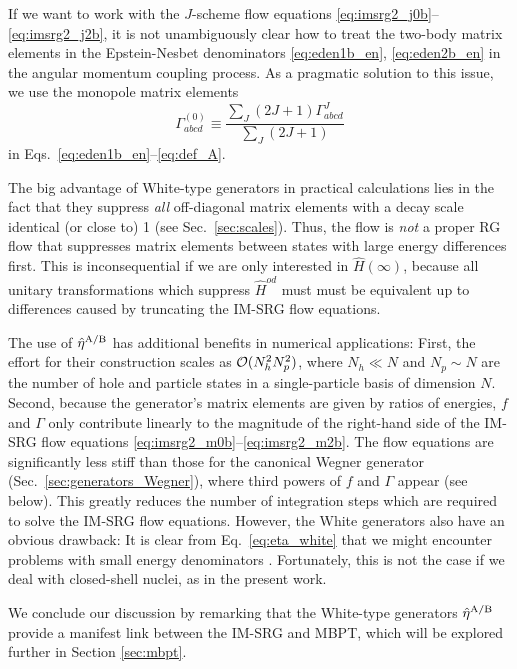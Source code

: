 If we want to work with the $J$-scheme flow equations \eqref{eq:imsrg2_j0b}--\eqref{eq:imsrg2_j2b}, it is not unambiguously clear how to treat the two-body matrix elements in the Epstein-Nesbet denominators \eqref{eq:eden1b_en}, \eqref{eq:eden2b_en} in the angular momentum coupling process. As a pragmatic solution to this issue, we use the monopole matrix elements
\begin{equation}
  \Gamma^{(0)}_{abcd}\equiv\frac{\sum_J(2J+1)\Gamma^J_{abcd}}{\sum_{J}(2J+1)}
\end{equation}
in Eqs.~\eqref{eq:eden1b_en}--\eqref{eq:def_A}. 

The big advantage of White-type generators in practical calculations lies in the fact that they suppress \emph{all} off-diagonal matrix elements with a decay scale identical (or close to) 1 (see Sec.~\ref{sec:scales}). Thus, the flow is \emph{not} a proper RG flow that suppresses matrix elements between states with large energy differences first. This is inconsequential if we are only interested in $\hat{H}(\infty)$, because all unitary transformations which suppress $\hat{H}^{od}$ must must be equivalent up to differences caused by truncating the IM-SRG flow equations.

The use of $\hat{\eta}^\text{A/B}$ has additional benefits in numerical applications: First, the effort for their construction scales as $\mathcal{O}(N_h^2N_p^2)$, where $N_h\ll N$ and $N_p\sim N$ are the number of hole and particle states in a single-particle basis of dimension $N$. Second, because the generator's matrix elements are given by ratios of energies, $f$ and $\Gamma$ only contribute linearly to the magnitude of the right-hand side of the IM-SRG flow equations \eqref{eq:imsrg2_m0b}--\eqref{eq:imsrg2_m2b}. The flow equations are significantly less stiff than those for the canonical Wegner generator (Sec.~\ref{sec:generators_Wegner}), where third powers of $f$ and $\Gamma$ appear (see below). This greatly reduces the number of integration steps which are required to solve the IM-SRG flow equations. However, the White generators also have an obvious drawback: It is clear from Eq.~\eqref{eq:eta_white} that we might encounter problems with small energy denominators \cite{Tsukiyama:2012fk,Hergert:2013ij}. Fortunately, this is not the case if we deal with closed-shell nuclei, as in the present work. 

We conclude our discussion by remarking that the White-type generators $\hat{\eta}^\text{A/B}$ provide a manifest link between the IM-SRG and MBPT, which will be explored further in Section \ref{sec:mbpt}. 


